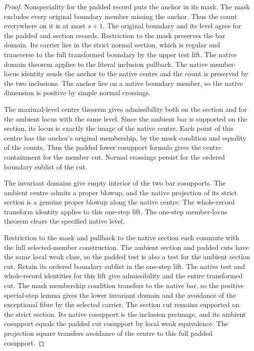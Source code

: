 \begin{proof}
Nonspeciality for the padded record puts the anchor in its mask. The
mask excludes every original boundary member missing the anchor. Thus
the count everywhere on it is at most $s+1$. The original boundary and
its level agree for the padded and section records. Restriction to the
mask preserves the bar domain. Its carrier lies in the strict normal
section, which is regular and transverse to the full transformed
boundary by the upper test lift. The native domain theorem applies to
the literal inclusion pullback. The native member-locus identity sends
the anchor to the native centre and the count is preserved by the two
inclusions. The anchor lies on a native boundary member, so the
native dimension is positive by simple normal crossings.

The maximal-level centre theorem gives admissibility both on the section
and for the ambient locus with the same level. Since the ambient bar is
supported on the section, its locus is exactly the image of the native
centre. Each point of this centre has the anchor's original membership,
by the mask condition and equality of the counts. Thus the padded lower
cosupport formula gives the centre containment for the member cut.
Normal crossings persist for the ordered boundary sublist of the cut.

The invariant domains give empty interior of the two bar cosupports.
The ambient centre admits a proper blowup, and the native projection of
its strict section is a genuine proper blowup along the native centre.
The whole-record transform identity applies to this one-step lift. The
one-step member-locus theorem clears the specified native level.

Restriction to the mask and pullback to the native section each
commute with the full selected-member construction. The ambient
section and padded cuts have the same local weak class, so the padded
test is also a test for the ambient section cut. Retain its ordered
boundary sublist in the one-step lift. The native test and whole-record
identities for this lift give admissibility and the entire transformed
cut. The mask membership condition transfers to the native bar, so
the positive special-step lemma gives the lower invariant domain and
the avoidance of the exceptional fibre by the selected carrier.
The section cut remains supported on the strict section. Its native
cosupport is the inclusion preimage, and its ambient cosupport equals
the padded cut cosupport by local weak equivalence. The projection
square transfers avoidance of the centre to this full padded cosupport.
\end{proof}

